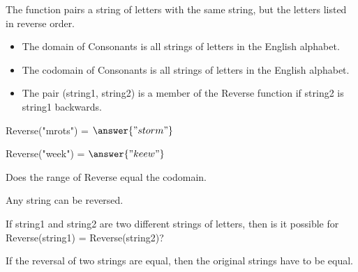 \documentclass{ximera}
\begin{document}
\begin{definition}
  The function  pairs a string of letters with the same string, but the letters listed in reverse order.
 
    \begin{itemize}
    \item The domain of Consonants is all strings of letters in the English alphabet.
    \item The codomain of Consonants is all strings of letters in the English alphabet.
    \item The pair (string1, string2) is a member of the Reverse function if string2 is string1 backwards.
    \end{itemize}

  
\end{definition}





\begin{exercise}
Reverse("mrots") = $\answer{"storm"}$
\end{exercise}


\begin{exercise}
Reverse("week") = $\answer{"keew"}$
\end{exercise}








\begin{exercise}

Does the range of Reverse equal the codomain.

  \begin{multipleChoice}
  \end{multipleChoice}
  \begin{feedback}
Any string can be reversed.
  \end{feedback}
\end{exercise}




\begin{exercise}

If string1 and string2 are two different strings of letters, then is it possible for Reverse(string1) = Reverse(string2)?

  \begin{multipleChoice}
  \end{multipleChoice}
  \begin{feedback}
If the reversal of two strings are equal, then the original strings have to be equal.
  \end{feedback}
\end{exercise}
\end{document}
